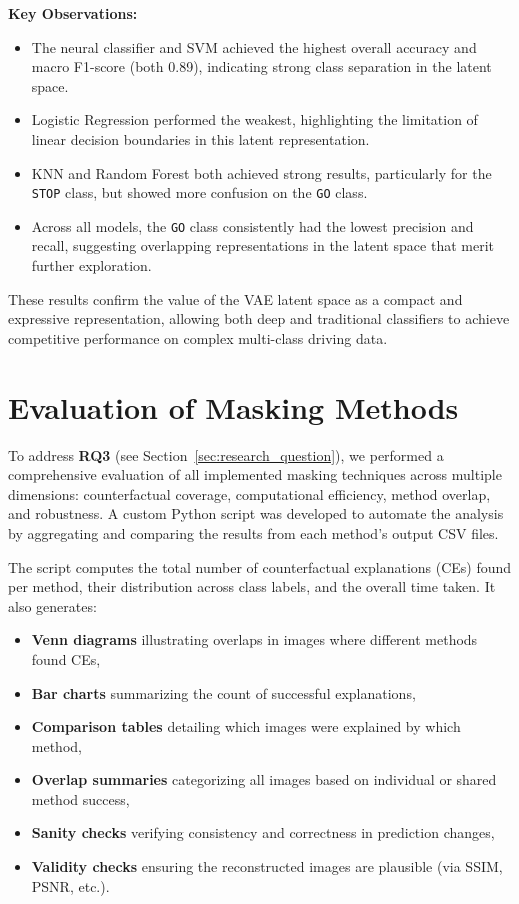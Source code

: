 \textbf{Key Observations:}
\begin{itemize}
    \item The neural classifier and SVM achieved the highest overall accuracy and macro F1-score (both 0.89), indicating strong class separation in the latent space.
    \item Logistic Regression performed the weakest, highlighting the limitation of linear decision boundaries in this latent representation.
    \item KNN and Random Forest both achieved strong results, particularly for the \texttt{STOP} class, but showed more confusion on the \texttt{GO} class.
    \item Across all models, the \texttt{GO} class consistently had the lowest precision and recall, suggesting overlapping representations in the latent space that merit further exploration.
\end{itemize}

These results confirm the value of the VAE latent space as a compact and expressive representation, allowing both deep and traditional classifiers to achieve competitive performance on complex multi-class driving data.



\section{Evaluation of Masking Methods} \label{sec:evaluation}
To address \textbf{RQ3} (see Section~\ref{sec:research_question}), we performed a comprehensive evaluation of all implemented masking techniques across multiple dimensions: counterfactual coverage, computational efficiency, method overlap, and robustness. A custom Python script was developed to automate the analysis by aggregating and comparing the results from each method's output CSV files.

The script computes the total number of counterfactual explanations (CEs) found per method, their distribution across class labels, and the overall time taken. It also generates:

\begin{itemize}
    \item \textbf{Venn diagrams} illustrating overlaps in images where different methods found CEs,
    \item \textbf{Bar charts} summarizing the count of successful explanations,
    \item \textbf{Comparison tables} detailing which images were explained by which method,
    \item \textbf{Overlap summaries} categorizing all images based on individual or shared method success,
    \item \textbf{Sanity checks} verifying consistency and correctness in prediction changes,
    \item \textbf{Validity checks} ensuring the reconstructed images are plausible (via SSIM, PSNR, etc.).
\end{itemize}


